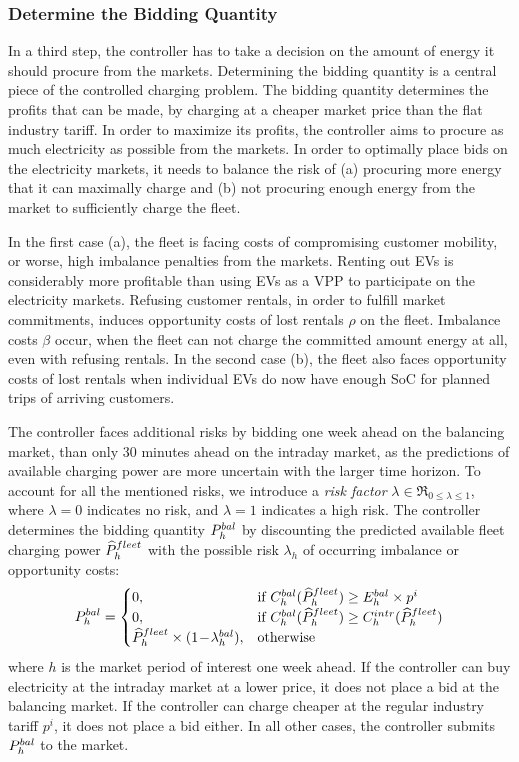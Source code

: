 \documentclass[a4paper, 12pt]{article}
\begin{document}
\subsubsection{Determine the Bidding Quantity}
\label{sec:org2af74d9}
In a third step, the controller has to take a decision on the amount of energy
it should procure from the markets. Determining the bidding quantity is a
central piece of the controlled charging problem. The bidding quantity
determines the profits that can be made, by charging at a cheaper market price
than the flat industry tariff. In order to maximize its profits, the controller
aims to procure as much electricity as possible from the markets. In order to
optimally place bids on the electricity markets, it needs to balance the risk of
(a) procuring more energy that it can maximally charge and (b) not procuring
enough energy from the market to sufficiently charge the fleet.

In the first case (a), the fleet is facing costs of compromising customer
mobility, or worse, high imbalance penalties from the markets. Renting out EVs
is considerably more profitable than using EVs as a VPP to participate on the
electricity markets. Refusing customer rentals, in order to fulfill market
commitments, induces opportunity costs of lost rentals \(\rho\) on the fleet.
Imbalance costs \(\beta\) occur, when the fleet can not charge the committed
amount energy at all, even with refusing rentals. In the second case (b), the
fleet also faces opportunity costs of lost rentals when individual EVs do now
have enough SoC for planned trips of arriving customers.

The controller faces additional risks by bidding one week ahead on the balancing
market, than only 30 minutes ahead on the intraday market, as the predictions of
available charging power are more uncertain with the larger time horizon. To
account for all the mentioned risks, we introduce a \emph{risk factor} \(\lambda \in
\Re_{0 \leq \lambda \leq 1}\), where \(\lambda = 0\) indicates no risk, and
\(\lambda = 1\) indicates a high risk. The controller determines the bidding
quantity \(P^{bal}_{h}\) by discounting the predicted available fleet charging power
\(\widehat{P}^{fleet}_{h}\) with the possible risk \(\lambda_{h}\) of occurring imbalance or
opportunity costs:
\begin{equation} \label{eq-model-pb}
  P^{bal}_{h}=
  \begin{cases}
    0, & \text{if}\ C^{bal}_{h}(\widehat{P}^{fleet}_{h}) \geq E^{bal}_{h} \times p^{i}\\
    0, & \text{if}\ C^{bal}_{h}(\widehat{P}^{fleet}_{h}) \geq C^{intr}_{h}(\widehat{P}^{fleet}_{h})\\
    \widehat{P}^{fleet}_{h} \times (1\!-\!\lambda^{bal}_{h}), & \text{otherwise}
  \end{cases}
\end{equation}
where \(h\) is the market period of interest one week ahead. If the controller can
buy electricity at the intraday market at a lower price, it does not place a bid
at the balancing market. If the controller can charge cheaper at the regular
industry tariff \(p^{i}\), it does not place a bid either. In all other cases, the
controller submits \(P^{bal}_{h}\) to the market.
\end{document}
